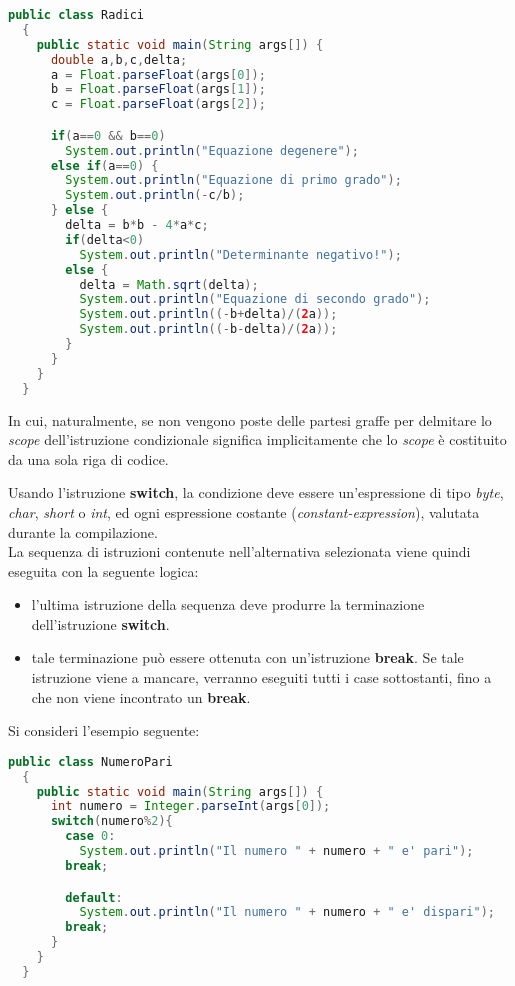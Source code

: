 \documentclass[a4paper]{extarticle}
\begin{document}
\vspace{1em}
\noindent
\begin{lstlisting}[language=Java, caption=Calcolo delle radici in Java]
  public class Radici
  {
    public static void main(String args[]) {
      double a,b,c,delta;
      a = Float.parseFloat(args[0]);
      b = Float.parseFloat(args[1]);
      c = Float.parseFloat(args[2]);

      if(a==0 && b==0)
        System.out.println("Equazione degenere");
      else if(a==0) {
        System.out.println("Equazione di primo grado");
        System.out.println(-c/b);
      } else {
        delta = b*b - 4*a*c;
        if(delta<0)
          System.out.println("Determinante negativo!");
        else {
          delta = Math.sqrt(delta);
          System.out.println("Equazione di secondo grado");
          System.out.println((-b+delta)/(2a));
          System.out.println((-b-delta)/(2a));
        }
      }
    }
  }
\end{lstlisting}

\vspace{1em}
\noindent
In cui, naturalmente, se non vengono poste delle partesi graffe per delmitare lo \emph{scope} dell'istruzione condizionale significa implicitamente che lo \emph{scope} è costituito da una sola riga di codice.

\vspace{1em}
\noindent
Usando l'istruzione \textbf{switch}, la condizione deve essere un'espressione di tipo \emph{byte}, \emph{char}, \emph{short} o \emph{int}, ed ogni espressione costante (\emph{constant-expression}), valutata durante la compilazione.\\
La sequenza di istruzioni contenute nell’alternativa selezionata viene quindi eseguita con la seguente logica:
\begin{itemize}
  \item l'ultima istruzione della sequenza deve produrre la terminazione dell’istruzione \textbf{switch}.
  \item tale terminazione può essere ottenuta con un'istruzione \textbf{break}. Se tale istruzione viene a mancare, verranno eseguiti tutti i case sottostanti, fino a che non viene incontrato un \textbf{break}.
\end{itemize}

\vspace{1em}
\noindent
Si consideri l'esempio seguente:

\vspace{1em}
\noindent
\begin{lstlisting}[language=Java, caption=Esempio dell'istruzione condizionale switch in Java]
  public class NumeroPari
  {
    public static void main(String args[]) {
      int numero = Integer.parseInt(args[0]);
      switch(numero%2){
        case 0:
          System.out.println("Il numero " + numero + " e' pari");
        break;

        default:
          System.out.println("Il numero " + numero + " e' dispari");
        break;
      }
    }
  }
\end{lstlisting}
\end{document}
